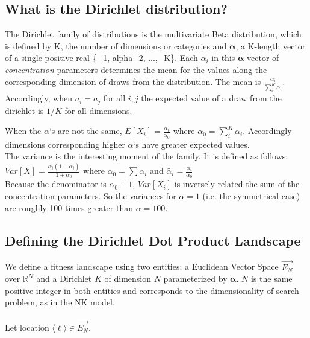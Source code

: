 \documentclass[12pt]{article}
\begin{document}
\subsection*{What is the Dirichlet distribution?}

The Dirichlet family of distributions is the multivariate Beta distribution, which is defined by K, the number of dimensions or categories and $\boldsymbol\alpha$, a K-length vector of a single positive real \{\alpha_1, alpha_2, ...,\alpha_K\}.  Each $\alpha_i$ in this $\boldsymbol\alpha$ vector of \textit{concentration} parameters determines the mean for the values along the corresponding dimension of draws from the distribution. The mean is  $\frac{\alpha_i}{\sum_{i}^{K} \alpha_i}$. Accordingly, when $a_i = a_j$ for all $i, j$  the expected value of a draw from the dirichlet is $1/K$ for all dimensions.

When the $\alpha$`s are not the same, $E[X_i] = \frac{\alpha_i}{\alpha_0}$ where $\alpha_0 = \sum_{i}^{K} \alpha_i$. Accordingly dimensions corresponding higher $\alpha$`s have greater expected values.\\

The variance is the interesting moment of the family. It is defined as follows:
$Var[X] = \frac{\tilde{\alpha_i}(1-\tilde{\alpha_i})}{1 + \alpha_0}$
where $\alpha_0 = \sum{\alpha_i}$ and $\tilde{\alpha_i} = \frac{\alpha_i}{\alpha_0}$\\

Because the denominator is $\alpha_0 + 1$, $Var[X_i]$ is inversely related the sum of the concentration parameters. So the variances for $\alpha = 1$ (i.e. the symmetrical case) are roughly 100 times greater than $\alpha = 100$.

\subsection*{Defining the Dirichlet Dot Product Landscape}

We define a fitness landscape using two entities; a Euclidean Vector Space $\vec{E_N}$ over $\mathbb{R}^{N}$ and a Dirichlet $K$ of dimension $N$ parameterized by $\boldsymbol\alpha$. $N$ is the same positive integer in both entities and corresponds to the dimensionality of search problem, as in the NK model.\\~\\

Let location $\langle \ell\rangle \in \vec{E_N}$.\\~\\
\end{document}
